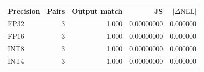 \begin{tabular}{lrrrr}
\toprule
Precision & Pairs & Output match & JS & $|\Delta\mathrm{NLL}|$ \\
\midrule
FP32 & 3 & 1.000 & 0.00000000 & 0.000000 \\
FP16 & 3 & 1.000 & 0.00000000 & 0.000000 \\
INT8 & 3 & 1.000 & 0.00000000 & 0.000000 \\
INT4 & 3 & 1.000 & 0.00000000 & 0.000000 \\
\bottomrule
\end{tabular}
